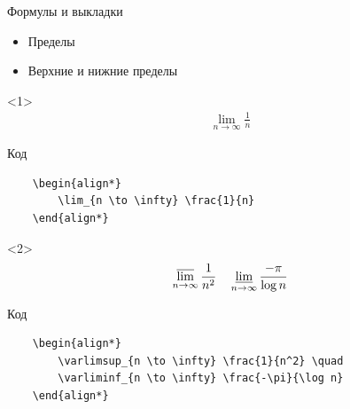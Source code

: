 
\begin{frame}[fragile]{Формулы и выкладки}

\begin{itemize}[<+->]
    \item Пределы
    \item Верхние и нижние пределы
\end{itemize}

\begin{onlyenv}<1>
    \begin{align*}
        \lim_{n \to \infty} \frac{1}{n}
    \end{align*}
    
    \begin{block}{Код}
        \begin{lstlisting}
    \begin{align*}
        \lim_{n \to \infty} \frac{1}{n}
    \end{align*}
        \end{lstlisting}
    \end{block}
\end{onlyenv}

\begin{onlyenv}<2>
    \begin{align*}
        \varlimsup_{n \to \infty} \frac{1}{n^2} \quad
        \varliminf_{n \to \infty} \frac{-\pi}{\log n}
    \end{align*}
    
    \begin{block}{Код}
        \begin{lstlisting}
    \begin{align*}
        \varlimsup_{n \to \infty} \frac{1}{n^2} \quad
        \varliminf_{n \to \infty} \frac{-\pi}{\log n}
    \end{align*}
        \end{lstlisting}
    \end{block}
\end{onlyenv}

\end{frame}


